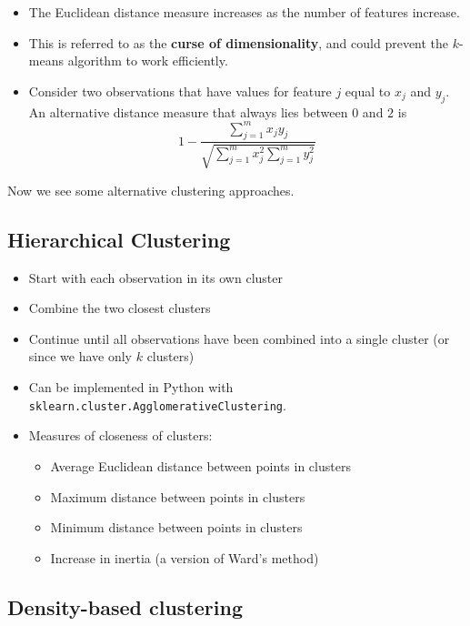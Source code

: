 \begin{itemize}
    \item The Euclidean distance measure increases as the number of features increase.
    \item This is referred to as the \textbf{curse of dimensionality}, and could prevent the $k$-means algorithm to work efficiently.
    \item Consider two observations that have values for feature $j$ equal to $x_{j}$ and $y_{j}$. An alternative distance measure that always lies between $0$ and $2$ is
          \begin{equation*}
              1-\frac{\sum _{j=1}^{m} x_{j} y_{j}}{\sqrt{\sum _{j=1}^{m} x_{j}^{2}\sum _{j=1}^{m} y_{j}^{2}}}
          \end{equation*}
\end{itemize}

Now we see some alternative clustering approaches.

\subsection{Hierarchical Clustering}

\begin{itemize}
    \item Start with each observation in its own cluster
    \item Combine the two closest clusters
    \item Continue until all observations have been combined into a single cluster (or since we have only $k$ clusters)
    \item Can be implemented in Python with \texttt{sklearn.cluster.AgglomerativeClustering}.
    \item Measures of closeness of clusters:
          \begin{itemize}
              \item Average Euclidean distance between points in clusters
              \item Maximum distance between points in clusters
              \item Minimum distance between points in clusters
              \item Increase in inertia (a version of Ward’s method)
          \end{itemize}
\end{itemize}

\subsection{Density-based clustering}


